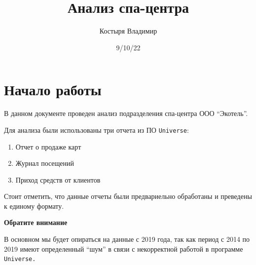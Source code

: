 \documentclass[
  letterpaper,
  DIV=11,
  numbers=noendperiod]{scrartcl}
\title{Анализ спа-центра}
\author{Костыря Владимир}
\date{9/10/22}
\providecommand{\tightlist}{%
  \setlength{\itemsep}{0pt}\setlength{\parskip}{0pt}}\usepackage{longtable,booktabs,array}
\renewcommand*\contentsname{Table of contents}
\newcommand\contentsname{Table of contents}
\begin{document}
\maketitle
\ifdefined\Shaded\renewenvironment{Shaded}{\begin{tcolorbox}[interior hidden, frame hidden, borderline west={3pt}{0pt}{shadecolor}, breakable, boxrule=0pt, enhanced, sharp corners]}{\end{tcolorbox}}\fi

\renewcommand*\contentsname{Table of contents}
{
\hypersetup{linkcolor=}
\setcounter{tocdepth}{2}
\tableofcontents
}

\hypertarget{ux43dux430ux447ux430ux43bux43e-ux440ux430ux431ux43eux442ux44b}{%
\chapter*{Начало
работы}\label{ux43dux430ux447ux430ux43bux43e-ux440ux430ux431ux43eux442ux44b}}


В данном документе проведен анализ подразделения спа-центра ООО
``Экотель''.

Для анализа были использованы три отчета из ПО \texttt{Universe}:

\begin{enumerate}
\def\labelenumi{\arabic{enumi}.}
\tightlist
\item
  Отчет о продаже карт
\item
  Журнал посещений
\item
  Приход средств от клиентов
\end{enumerate}

Стоит отметить, что данные отчеты были предвариельно обработаны и
преведены к единому формату.

\begin{tcolorbox}[enhanced jigsaw, left=2mm, bottomrule=.15mm, opacityback=0, arc=.35mm, colframe=quarto-callout-important-color-frame, rightrule=.15mm, colback=white, toprule=.15mm, breakable, leftrule=.75mm]
\begin{minipage}[t]{5.5mm}
\textcolor{quarto-callout-important-color}{\faExclamation}
\end{minipage}%
\begin{minipage}[t]{\textwidth - 5.5mm}

\textbf{Обратите внимание}\vspace{2mm}

В основном мы будет опираться на данные с 2019 года, так как период с
2014 по 2019 имеют определенный ``шум'' в связи с некорректной работой в
программе \texttt{Universe.}

\end{minipage}%
\end{tcolorbox}
\end{document}
